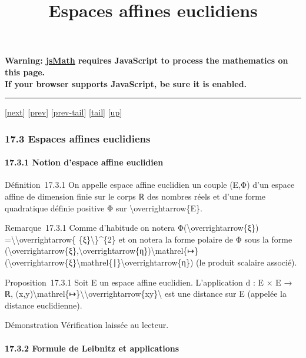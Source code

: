 \documentclass[]{article}
\title{Espaces affines euclidiens}
\author{}
\date{}
\begin{document}
\maketitle

\textbf{Warning: \href{http://www.math.union.edu/locate/jsMath}{jsMath}
requires JavaScript to process the mathematics on this page.\\ If your
browser supports JavaScript, be sure it is enabled.}

\begin{center}\rule{3in}{0.4pt}\end{center}

{[}\href{coursse95.html}{next}{]} {[}\href{coursse93.html}{prev}{]}
{[}\href{coursse93.html\#tailcoursse93.html}{prev-tail}{]}
{[}\hyperref[tailcoursse94.html]{tail}{]}
{[}\href{coursch18.html\#coursse94.html}{up}{]}

\subsubsection{17.3 Espaces affines euclidiens}

\paragraph{17.3.1 Notion d'espace affine euclidien}

Définition~17.3.1 On appelle espace affine euclidien un couple (E,Φ)
d'un espace affine de dimension finie sur le corps ℝ des nombres réels
et d'une forme quadratique définie positive Φ sur
\textbackslash{}overrightarrow\{E\}.

Remarque~17.3.1 Comme d'habitude on notera
Φ(\textbackslash{}overrightarrow\{ξ\})
=\textbackslash{}\textbar{}\textbackslash{}overrightarrow\{
\{ξ\}\textbackslash{}\textbar{}\}\^{}\{2\} et on notera la forme polaire
de Φ sous la forme
(\textbackslash{}overrightarrow\{ξ\},\textbackslash{}overrightarrow\{η\})\textbackslash{}mathrel\{↦\}(\textbackslash{}overrightarrow\{ξ\}\textbackslash{}mathrel\{∣\}\textbackslash{}overrightarrow\{η\})
(le produit scalaire associé).

Proposition~17.3.1 Soit E un espace affine euclidien. L'application d :
E × E → ℝ,
(x,y)\textbackslash{}mathrel\{↦\}\textbackslash{}\textbar{}\textbackslash{}overrightarrow\{xy\}\textbackslash{}\textbar{}
est une distance sur E (appelée la distance euclidienne).

Démonstration Vérification laissée au lecteur.

\paragraph{17.3.2 Formule de Leibnitz et applications}
\end{document}
